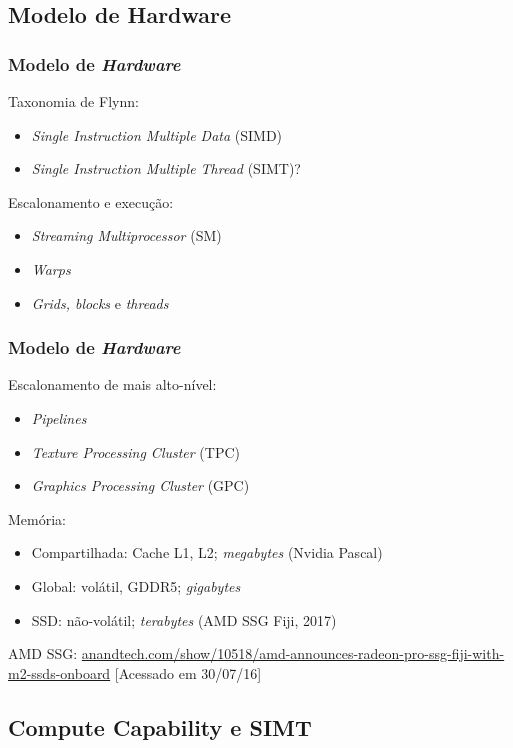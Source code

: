 \documentclass[10pt, compress]{beamer}
\begin{document}
\subsection{Modelo de Hardware}

\begin{frame}
    \frametitle{Modelo de \textit{Hardware}}
    Taxonomia de Flynn:
    \begin{itemize}
        \item \textit{Single Instruction Multiple Data} (SIMD)
            \pause
        \item \textit{Single Instruction Multiple Thread} (SIMT)?
    \end{itemize}
    \pause
    Escalonamento e execução:
    \begin{itemize}
        \item \textit{Streaming Multiprocessor} (SM)
            \pause
        \item \textit{Warps}
            \pause
        \item \textit{Grids, blocks} e \textit{threads}
    \end{itemize}
\end{frame}

\begin{frame}
    \frametitle{Modelo de \textit{Hardware}}
    Escalonamento de mais alto-nível:
    \begin{itemize}
        \item \textit{Pipelines}
        \item \textit{Texture Processing Cluster} (TPC)
        \item \textit{Graphics Processing Cluster} (GPC)
    \end{itemize}
    \pause
    Memória:
    \begin{itemize}
        \item Compartilhada: Cache L1, L2; \textit{megabytes} (Nvidia Pascal)
        \item Global: volátil, GDDR5; \textit{gigabytes}
            \pause
        \item SSD: \alert{não-volátil}; \alert{\textit{terabytes}} (AMD SSG Fiji, 2017)
    \end{itemize}
    \vfill

    \tiny{AMD SSG: \url{anandtech.com/show/10518/amd-announces-radeon-pro-ssg-fiji-with-m2-ssds-onboard} [Acessado em 30/07/16]}
\end{frame}

\subsection{Compute Capability e SIMT}
\end{document}

